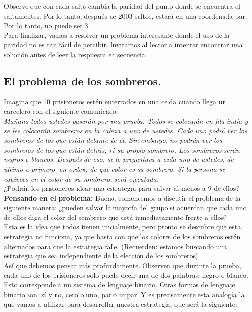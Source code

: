 \documentclass[11pt]{scrartcl}
\begin{document}
Observe que con cada salto cambia la paridad del punto donde se encuentra el saltamontes. Por lo tanto, después de 2003 saltos, estará en una coordenada par. Por lo tanto, no puede ser 3.\\

Para finalizar, vamos a resolver un problema interesante donde el uso de la paridad no es tan fácil de percibir. Invitamos al lector a intentar encontrar una solución antes de leer la respuesta en secuencia.

\subsection*{El problema de los sombreros.}

Imagina que 10 prisioneros estén encerrados en una celda cuando llega un carcelero con el siguiente comunicado:\\

    \textit{Mañana todos ustedes pasarán por una prueba. Todos se colocarán en fila india y se les colocarán sombreros en la cabeza a uno de ustedes. Cada uno podrá ver los sombreros de los que están delante de él. Sin embargo, no podrán ver los sombreros de los que están detrás, ni su propio sombrero. Los sombreros serán negros o blancos. Después de eso, se le preguntará a cada uno de ustedes, de último a primero, en orden, de qué color es su sombrero. Si la persona se equivoca en el color de su sombrero, será ejecutada.}\\

¿Podrán los prisioneros idear una estrategia para salvar al menos a 9 de ellos?\\

\textbf{Pensando en el problema:}
Bueno, comencemos a discutir el problema de la siguiente manera: ¿pueden salvar la mayoría del grupo si acuerdan que cada uno de ellos diga el color del sombrero que está inmediatamente frente a ellos?\\

Esta es la idea que todos tienen inicialmente, pero pronto se descubre que esta estrategia no funciona, ya que basta con que los colores de los sombreros estén alternados para que la estrategia falle. (Recuerden: estamos buscando una estrategia que sea independiente de la elección de los sombreros). \\

Así que debemos pensar más profundamente. Observen que durante la prueba, cada uno de los prisioneros solo puede decir una de dos palabras: negro o blanco. Esto corresponde a un sistema de lenguaje binario. Otras formas de lenguaje binario son: sí y no, cero o uno, par o impar. Y es precisamente esta analogía la que vamos a utilizar para desarrollar nuestra estrategia, que será la siguiente:\\
\end{document}
